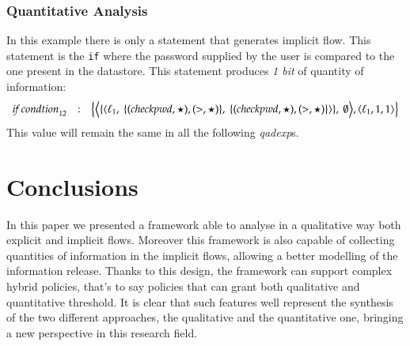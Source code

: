 \documentclass{llncs}
\newcommand{\blangle}{\big\langle}
\newcommand{\brangle}{\big\rangle}
\begin{document}
\subsubsection{Quantitative Analysis}
In this example there is only a statement that generates implicit flow. This statement is the \texttt{if} where the password supplied by the user is compared to the one present in the datastore. This statement produces \emph{1 bit} of quantity of information:
{\small \begin{align*}
\begin{array}{ccl}
\mbox{\textit{if condtion}}_{12} & : & \big \{ \blangle\{\langle \ell_1,\ \{(checkpwd, \star), (>, \star)\},\ \{(checkpwd, \star), (>, \star)\}\rangle\},\ \emptyset\brangle, \langle \ell_1, 1, 1 \rangle \big \}
\end{array}
\end{align*}}
This value will remain the same in all the following \emph{qadexp}s.


\section{Conclusions}

In this paper we presented a framework able to analyse in a qualitative way both explicit and implicit flows. Moreover this framework is also capable of collecting quantities of information in the implicit flows, allowing a better modelling of the information release. Thanks to this design, the framework can support complex hybrid policies, that's to say policies that can grant both qualitative and quantitative threshold. It is clear that such features well represent the synthesis of the two different approaches, the qualitative and the quantitative one, bringing a new perspective in this research field.\\


\begin{small}


\end{small}
\end{document}
